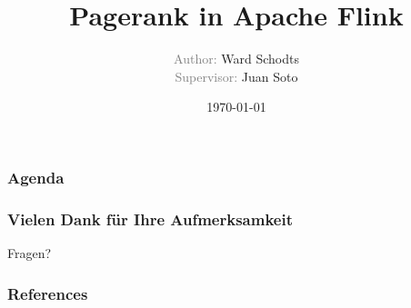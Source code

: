 \documentclass[hyperref={pdfpagelayout=SinglePage}]{beamer}
\author{\textcolor{gray}{Author:} Ward Schodts\\ \textcolor{gray}{Supervisor:}
Juan Soto}
\title{Pagerank in Apache Flink}
\institute{Datenbanksysteme und Informationsmanagement \\
Technische Universität Berlin \\[0.5cm]
\texttt{[image: tulogo]}}
\date{\today}
\begin{document}
\begin{frame}
\maketitle
\end{frame}

\begin{frame}
\frametitle{Agenda}
\tableofcontents
\end{frame}









\begin{frame}
\frametitle{Vielen Dank für Ihre Aufmerksamkeit}
\begin{center}
{\LARGE Fragen?}
\end{center}



\end{frame}

\begin{frame}[allowframebreaks]
		
        \frametitle{References}
        \nocite{*}
        \printbibliography

\end{frame}
\end{document}
